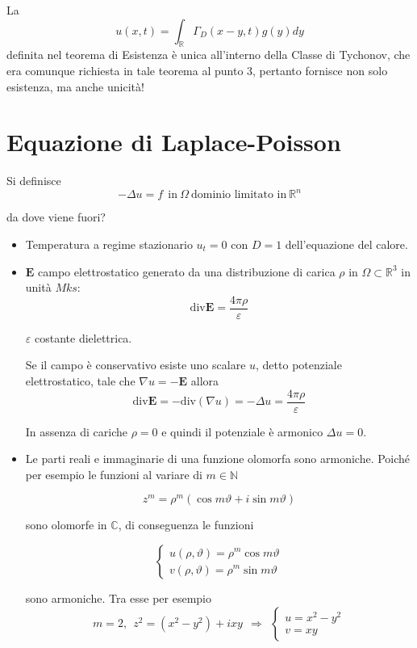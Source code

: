 \documentclass[10pt,a4paper,twoside,openright]{book}
\begin{document}
La
\begin{equation*}
u(x,t) =\int _{\mathbb{R}} \Gamma _{D}(x-y,t) g(y) dy
\end{equation*}
definita nel teorema di Esistenza è unica all'interno della Classe di Tychonov, che era comunque richiesta in tale teorema al punto $3$, pertanto fornisce non solo esistenza, ma anche unicità!
\chapter{Equazione di Laplace-Poisson}
\begin{definition}
 Si definisce
\begin{equation*}
\boxed{-\Delta u=f} \ \ \text{in} \ \Omega \ \text{dominio limitato in} \ \mathbb{R}^{n}
\end{equation*}
\end{definition}
da dove viene fuori?
\begin{itemize}
\item Temperatura a regime stazionario $u_{t}=0$ con $D=1$ dell'equazione del calore.
\item $\mathbf{E}$ campo elettrostatico generato da una distribuzione di carica $\rho $ in $\Omega \subset \mathbb{R}^{3}$ in unità $Mks$:\begin{equation*}
\mathrm{div}\mathbf{E} =\frac{4\pi \rho }{\varepsilon }
\end{equation*}

$\varepsilon $ costante dielettrica.

Se il campo è conservativo esiste uno scalare $u$, detto potenziale elettrostatico, tale che $\nabla u=-\mathbf{E}$ allora\begin{equation*}
\mathrm{div}\mathbf{E} =-\mathrm{div}(\nabla u) =-\Delta u=\frac{4\pi \rho }{\varepsilon }
\end{equation*}

In assenza di cariche $\rho =0$ e quindi il potenziale è armonico $\Delta u=0$.
\item Le parti reali e immaginarie di una funzione olomorfa sono armoniche. Poiché per esempio le funzioni al variare di $m\in \mathbb{N}$

\begin{equation*}
z^{m} =\rho ^{m}(\cos m\vartheta +i\sin m\vartheta)
\end{equation*}

sono olomorfe in $\mathbb{C}$, di conseguenza le funzioni

\begin{equation*}
\begin{cases}
u( \rho,\vartheta) =\rho ^{m}\cos m\vartheta \\
v( \rho,\vartheta) =\rho ^{m}\sin m\vartheta 
\end{cases}
\end{equation*}

sono armoniche. Tra esse per esempio\begin{equation*}
m=2,\ \ z^{2} =\left( x^{2} -y^{2}\right) +ixy\ \ \Rightarrow \ \ \begin{cases}
u=x^{2} -y^{2}\\
v=xy
\end{cases}
\end{equation*}
\end{itemize}
\end{document}
